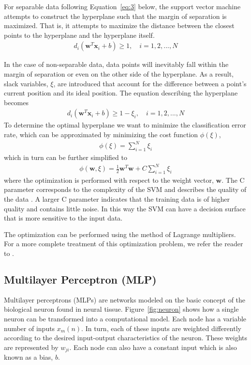 \documentclass[11pt,letterpaper,titlepage]{article}
\numberwithin{equation}{section}
\numberwithin{figure}{section}
\numberwithin{table}{section}
\begin{document}
For separable data following Equation~\ref{eq:3} below, the support vector machine attempts to construct the hyperplane such that the margin of separation is maximized. That is, it attempts to maximize the distance between the closest points to the hyperplane and the hyperplane itself.
\begin{gather}
  \label{eq:3}
  d_i\left( \mathbf{w}^T\mathbf{x}_i + b\right) \geq 1, \quad i=1,2,...,N
\end{gather}

In the case of non-separable data, data points will inevitably fall within the margin of separation or even on the other side of the hyperplane. As a result, slack variables, \(\xi\), are introduced that account for the difference between a point's current position and its ideal position. The equation describing the hyperplane becomes
\begin{gather}
  \label{eq:4}
  d_i\left( \mathbf{w}^T\mathbf{x}_i + b\right) \geq 1-\xi_i, \quad i=1,2,...,N
\end{gather}
To determine the optimal hyperplane we want to minimize the classification error rate, which can be approximated by minimizing the cost function \(\phi(\xi)\),
\begin{gather}
  \label{eq:5}
  \phi(\xi) = \sum_{i=1}^{N} \xi_i
\end{gather}
which in turn can be further simplified to
\begin{gather}
  \label{eq:6}
  \phi(\mathbf{w},\xi) = \frac{1}{2}\mathbf{w}^T\mathbf{w} + C \sum_{i=1}^{N} \xi_i
\end{gather}
where the optimization is performed with respect to the weight vector, \(\mathbf{w}\). The C parameter corresponds to the complexity of the SVM and describes the quality of the data \cite{Haykin2008}. A larger C parameter indicates that the training data is of higher quality and contains little noise. In this way the SVM can have a decision surface that is more sensitive to the input data.

The optimization can be performed using the method of Lagrange multipliers. For a more complete treatment of this optimization problem, we refer the reader to \cite{Haykin2008}.

\subsection{Multilayer Perceptron (MLP)}
\label{sec:mult-perc}

Multilayer perceptrons (MLPs) are networks modeled on the basic concept of the biological neuron found in neural tissue. Figure~\ref{fig:neuron} shows how a single neuron can be transformed into a computational model. Each node has a variable number of inputs \(x_m(n)\). In turn, each of these inputs are weighted differently according to the desired input-output characteristics of the neuron. These weights are represented by \(w_{ji}\). Each node can also have a constant input which is also known as a bias, \(b\).
\end{document}
